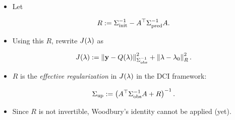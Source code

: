 \begin{frame}
\begin{itemize}
\item Let

\begin{equation}\label{eq:eff_reg}
	R := \nolinebreak \initialCov^{-1} - \nolinebreak A^\top \predictedCov^{-1} A.
\end{equation}

\bigskip
\item Using this $R$, rewrite $J(\lambda)$ as

\begin{equation}\label{eq:dci-objective-alt}
J(\lambda):= \left\Vert\mathbf{y} - Q(\lambda)\right\Vert_{\Sigma_\text{obs}^{-1}}^2 + \left\Vert\lambda - \lambda_0\right\Vert_{R}^2.
\end{equation}

\bigskip
\item $R$ is the {\em effective regularization} in $J(\lambda)$ in the DCI framework:

\begin{equation}
	\Sigma_\text{up} := \left(A^\top \Sigma_\text{obs}^{-1} A + R\right)^{-1}.
\end{equation}

\bigskip
\item Since $R$ is not invertible, Woodbury's identity cannot be applied (yet).

\end{itemize}

\end{frame}

